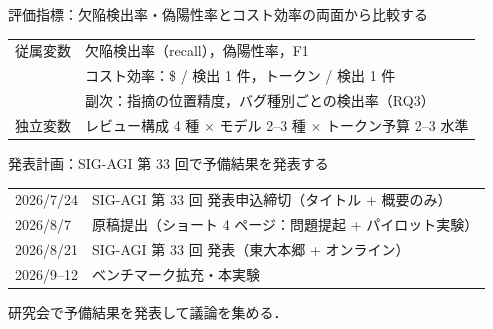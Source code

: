 \documentclass[10pt, aspectratio=169, t]{beamer}
\begin{document}
\begin{frame}{評価指標：欠陥検出率・偽陽性率とコスト効率の両面から比較する}
    \vspace{2pt}
    \begin{center}
    \begin{tabularx}{0.94\textwidth}{lX}
        \toprule
        従属変数 & 欠陥検出率（recall），偽陽性率，F1 \\
                & コスト効率：\$ / 検出 1 件，トークン / 検出 1 件 \\
                & 副次：指摘の位置精度，バグ種別ごとの検出率（RQ3） \\
        \midrule
        独立変数 & レビュー構成 4 種 × モデル 2--3 種 × トークン予算 2--3 水準 \\
        \bottomrule
    \end{tabularx}
    \end{center}
\end{frame}

\begin{frame}{発表計画：SIG-AGI 第 33 回で予備結果を発表する}
    \vspace{4pt}
    \begin{center}
    \begin{tabular}{ll}
        \toprule
        2026/7/24 & \alert{SIG-AGI 第 33 回 発表申込締切}（タイトル + 概要のみ） \\
        2026/8/7 & 原稿提出（ショート 4 ページ：問題提起 + パイロット実験） \\
        2026/8/21 & \alert{SIG-AGI 第 33 回 発表}（東大本郷 + オンライン） \\
        2026/9--12 & ベンチマーク拡充・本実験 \\
        \bottomrule
    \end{tabular}
    \end{center}
    \vspace{4pt}
    研究会で予備結果を発表して議論を集める．
\end{frame}

\appendix
\begin{frame}[standout]
\end{frame}
\end{document}
